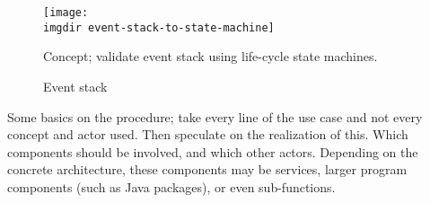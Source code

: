 \begin{figure}[ht]
\centering
\texttt{[image: \\imgdir event-stack-to-state-machine]}
\caption{Concept; validate event stack using life-cycle state machines.}
\label{fig:event-stack-to-state-machine}
\end{figure}

\begin{figure}[ht]
\centering
\begin{drawstack}
\end{drawstack}
\caption{Event stack}
\label{fig:event-stack-example}
\end{figure}

Some basics on the procedure; take every line of the use case and not every concept and actor used. Then speculate on the realization of this. Which components should be involved, and which other actors. Depending on the concrete architecture, these components may be services, larger program components (such as Java packages), or even sub-functions.



